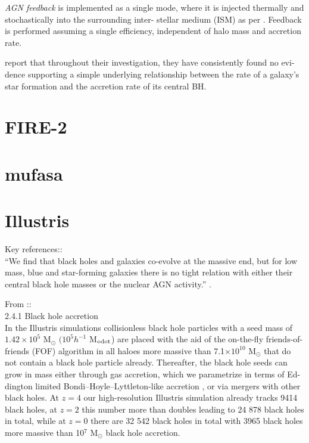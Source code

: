 \documentclass[11pt,a4paper]{article}
\begin{document}
{\it AGN feedback} is implemented as a single mode, where it is
injected thermally and stochastically into the surrounding inter-
stellar medium (ISM) as per \citet{Booth_Schaye2009}. Feedback is
performed assuming a single efficiency, independent of halo mass and
accretion rate.

\citet{McAlpine2017} report that throughout their investigation, they
have consistently found no evi- dence supporting a simple underlying
relationship between the rate of a galaxy’s star formation and the
accretion rate of its central BH.




\section{FIRE-2}

\section{{\sc mufasa}}

\section{Illustris}
Key references:: \citet{Sijacki2015} \\
``We find that black holes and galaxies co-evolve at the massive end,
but for low mass, blue and star-forming galaxies there is no tight
relation with either their central black hole masses or the nuclear
AGN activity.''  \citep{Sijacki2015}. 

\noindent
From \citep{Sijacki2015}:: \\ 
2.4.1 Black hole accretion\\
In the Illustris simulations collisionless black hole particles with a
seed mass of $1.42\times10^{5}$ M$_{\odot}$ $(10^{5} h^{-1}$ M$_{\rm
odot}$) are placed with the aid of the on-the-fly friends-of-friends
(FOF) algorithm in all haloes more massive than 7.1$\times10^{10}$
M$_{\odot}$ that do not contain a black hole particle
already. Thereafter, the black hole seeds can grow in mass either
through gas accretion, which we parametrize in terms of Ed- dington
limited Bondi–Hoyle–Lyttleton-like accretion \citep[for further
details see][]{DiMatteo2005, Springel2005}, or via mergers with other
black holes. At $z = 4$ our high-resolution Illustris simulation
already tracks 9414 black holes, at $z = 2$ this number more than
doubles leading to 24 878 black holes in total, while at $z = 0$ there
are 32 542 black holes in total with 3965 black holes more massive
than 10$^7$ M$_{\odot}$ black hole accretion.
\end{document}
